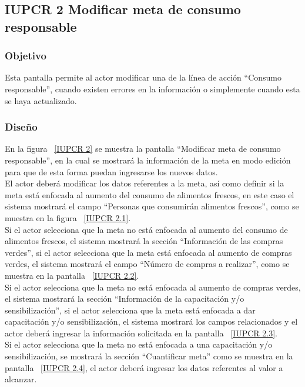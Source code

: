 \subsection{IUPCR 2 Modificar meta de consumo responsable}
                     
\subsubsection{Objetivo}

   Esta pantalla permite al actor modificar una  de la línea de acción ``Consumo responsable'', cuando existen errores en la información o simplemente cuando esta se haya actualizado.

	
\subsubsection{Diseño}

  En la figura ~\ref{IUPCR 2} se muestra la pantalla ``Modificar meta de consumo responsable'', en la cual se mostrará la información de la meta en modo edición para que
  de esta forma puedan ingresarse los nuevos datos.\\

  El actor deberá modificar los datos referentes a la meta, así como definir si la meta está enfocada al aumento del consumo de alimentos frescos, 
  en este caso el sistema mostrará el campo ``Personas que consumirán alimentos frescos'', como se muestra en la figura ~\ref{IUPCR 2.1}.\\
  
  Si el actor selecciona que la meta no está enfocada al aumento del consumo de alimentos frescos, el sistema mostrará la sección ``Información de las compras verdes'',
  si el actor selecciona que la meta está enfocada al aumento de compras verdes, el sistema mostrará el campo ``Número de compras a realizar'', como se muestra en la pantalla ~\ref{IUPCR 2.2}.\\
  
    
  Si el actor selecciona que la meta no está enfocada al aumento de compras verdes, el sistema mostrará la sección ``Información de la capacitación y/o sensibilización'',
  si el actor selecciona que la meta está enfocada a dar capacitación y/o sensibilización, el sistema mostrará los campos relacionados y
  el actor deberá ingresar la información solicitada en la pantalla ~\ref{IUPCR 2.3}.\\
    
  Si el actor selecciona que la meta no está enfocada a una capacitación y/o sensibilización, se mostrará la sección ``Cuantificar meta'' como se muestra en la pantalla ~\ref{IUPCR 2.4}, el actor 
  deberá ingresar los datos referentes al valor a alcanzar.\\
 
